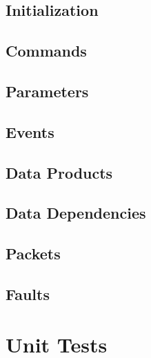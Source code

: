 \subsection{Initialization}


\subsection{Commands}



\subsection{Parameters}



\subsection{Events}



\subsection{Data Products}



\subsection{Data Dependencies}



\subsection{Packets}



\subsection{Faults}



\section{Unit Tests}

